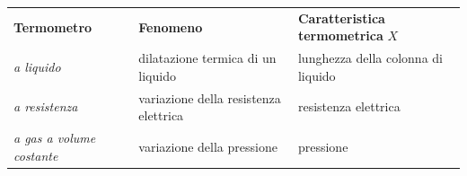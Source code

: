 \documentclass[x11names]{report}
\begin{document}
	\begin{center}
		\begin{table}[H]
			\begin{tabular}{@{}lll@{}}
				\textbf{Termometro}   & \textbf{Fenomeno}   & \textbf{Caratteristica termometrica} \(X\)     \\
				\textit{a liquido}  & dilatazione termica di un liquido   & lunghezza della colonna di liquido     \\
				\textit{a resistenza}   & variazione della resistenza elettrica  & resistenza elettrica     \\
				\textit{a gas a volume costante}   & variazione della pressione  & pressione  \\        
			\end{tabular}
		\end{table}
	\end{center}
	
\end{document}
